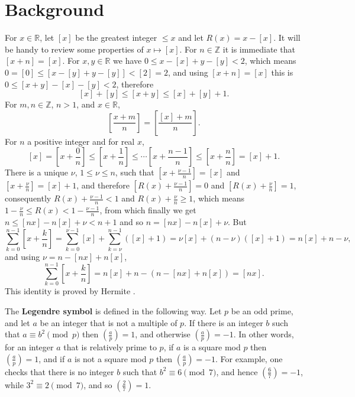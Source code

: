\documentclass{amsart}
\begin{document}
\section{Background}
\label{background}
For $x \in \mathbb{R}$, let $[ x ]$ be the greatest integer $\leq x$ and let $R(x)=x-[x]$.
It will be handy to review some properties of $x \mapsto [x]$.
For $n \in \mathbb{Z}$ it is immediate that $[x+n]=[x]$. 
For $x,y \in \mathbb{R}$ we have
$0 \leq x-[x] + y - [y] < 2$, which means
$0 = [0] \leq [x-[y]+y-[y]] < [2] = 2$, and using $[x+n]=[x]$ this is $0 \leq [x+y]-[x]-[y] < 2$, therefore
\[
[x] + [y] \leq [x+y] \leq [x]+[y]+1.
\]
For $m,n \in \mathbb{Z}$, $n>1$, and $x \in \mathbb{R}$,
\[
\left[ \frac{x+m}{n} \right] = \left[ \frac{[x]+m}{n} \right].
\]
For $n$ a positive integer and for real $x$,
\[
[x]=\left[x+\frac{0}{n}\right] \leq \left[x+\frac{1}{n}\right] \leq \cdots \left[x+\frac{n-1}{n} \right] \leq \left[x+\frac{n}{n} \right]
=[x]+1.
\]
There is a unique $\nu$, $1 \leq \nu \leq n$, such that $\left[x+\frac{\nu-1}{n} \right]= [x]$ and
$\left[x+\frac{\nu}{n} \right] = [x]+1$, 
and therefore $\left[R(x) + \frac{\nu-1}{n} \right] = 0$ and 
$\left[ R(x) + \frac{\nu}{n} \right]=1$, consequently
$R(x)+\frac{\nu-1}{n}<1$ and $R(x)+\frac{\nu}{n} \geq 1$, which means
$1-\frac{\nu}{n} \leq R(x) < 1-\frac{\nu-1}{n}$, from which finally we get
$n \leq [nx]-n[x]+\nu<n+1$ and so $n=[nx]-n[x]+\nu$.
But
\[
\sum_{k=0}^{n-1} \left[x+\frac{k}{n} \right] = \sum_{k=0}^{\nu-1} [x] + \sum_{k=\nu}^{n-1} ([x]+1)
=\nu [x] + (n-\nu)([x]+1)
=n[x]+n-\nu,
\]
and using $\nu=n-[nx]+n[x]$,
\[
\sum_{k=0}^{n-1} \left[x+\frac{k}{n} \right]  = n[x]+n-(n-[nx]+n[x]) = [nx].
\] 
This identity is proved by Hermite \cite[pp.~310--315, \S V]{hermite}.







The \textbf{Legendre symbol} is defined in the following way. Let $p$ be an odd prime, and let $a$ be an integer that is not a multiple of $p$.
If there is an integer $b$ such that $a \equiv b^2 \pmod{p}$ then
$\left( \frac{a}{p} \right)=1$, and otherwise $\left( \frac{a}{p} \right)=-1$. In other words, for an integer $a$ that is relatively prime to $p$, if $a$ is a square mod $p$ then
$\left( \frac{a}{p} \right)=1$, and if $a$ is not a square mod $p$ then $\left( \frac{a}{p} \right)=-1$. For example, one checks that there is no integer $b$ such that
$b^2 \equiv 6 \pmod{7}$, and hence $\left( \frac{6}{7} \right)=-1$, while $3^2 \equiv 2 \pmod{7}$, and so $\left( \frac{2}{7} \right)=1$.
\end{document}
